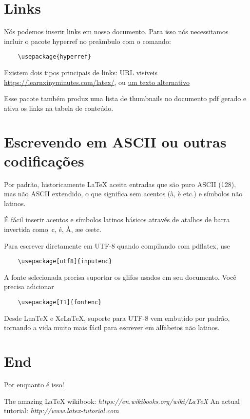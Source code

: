 \documentclass[12pt]{article}
\begin{document}
\section{Links}
Nós podemos inserir links em nosso documento. Para isso nós necessitamos incluir
o pacote hyperref no preâmbulo com o comando:
\begin{verbatim} 
    \usepackage{hyperref}
\end{verbatim}

Existem dois tipos principais de links: URL visíveis \\
\url{https://learnxinyminutes.com/latex/}, ou
\href{https://learnxinyminutes.com/latex/}{um texto alternativo}

Esse pacote também produz uma lista de thumbnails no documento pdf gerado e
ativa os links na tabela de conteúdo.

\section{Escrevendo em ASCII ou outras codificações}

Por padrão, historicamente LaTeX aceita entradas que são puro ASCII (128),
mas não ASCII extendido, o que significa sem acentos (à, è etc.) e símbolos não latinos.

É fácil inserir acentos e símbolos latinos básicos através de atalhos de barra invertida
como \,c, \'e, \`A, \ae e \oe etc.  %

Para escrever diretamente em UTF-8 quando compilando com pdflatex, use
\begin{verbatim}
    \usepackage[utf8]{inputenc}
\end{verbatim}
A fonte selecionada precisa suportar os glifos usados em seu documento. Você precisa adicionar
\begin{verbatim}
    \usepackage[T1]{fontenc}
\end{verbatim}

Desde LuaTeX e XeLaTeX, suporte para UTF-8 vem embutido por padrão, tornando a vida muito
mais fácil para escrever em alfabetos não latinos.

\section{End}

Por enquanto é isso!

\begin{thebibliography}{1}
   The amazing \LaTeX{} wikibook: {\em 
https://en.wikibooks.org/wiki/LaTeX}
   An actual tutorial: {\em http://www.latex-tutorial.com}
\end{thebibliography}

\end{document}
